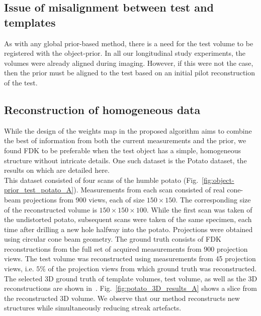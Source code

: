 \documentclass[journal]{IEEEtran}
\begin{document}
\subsection{Issue of misalignment between test and templates}
As with any global prior-based method, there is a need for the test volume to be registered with the object-prior. In all our longitudinal study experiments, the volumes were already aligned during imaging. However, if this were not the case, then the prior must be aligned to the test based on an initial pilot reconstruction of the test.

\subsection{Reconstruction of homogeneous data}
\label{Sec:potato}
While the design of the weights map in the proposed algorithm aims to combine the best of information from both the current measurements and the prior, we found FDK to be preferable when the test object has a simple, homogeneous structure without intricate details. One such dataset is the Potato dataset, the results on which are detailed here.\\
This dataset consisted of four scans of the humble potato (Fig.~\ref{fig:object-prior_test_potato_A}). Measurements from each scan consisted of real cone-beam projections from 900 views, each of size $150\times150$. The corresponding size of the reconstructed volume is $150\times150\times100$. While the first scan was taken of the undistorted potato, subsequent scans were taken of the same specimen, each time after drilling a new hole halfway into the potato.  Projections were obtained using circular cone beam geometry.  %
The ground truth consists of FDK reconstructions from the full set of acquired measurements from 900 projection views. The test volume was reconstructed using measurements from 45 projection views, i.e. $5\%$ of the projection views from which ground truth was reconstructed.  The selected 3D
ground truth of template volumes, test volume, as well as the 3D reconstructions are shown in~\cite{supp_paper}. Fig.~\ref{fig:potato_3D_results_A} shows a slice from the reconstructed 3D volume. We observe that our method reconstructs new structures while simultaneously reducing streak artefacts.\\ %
\end{document}
